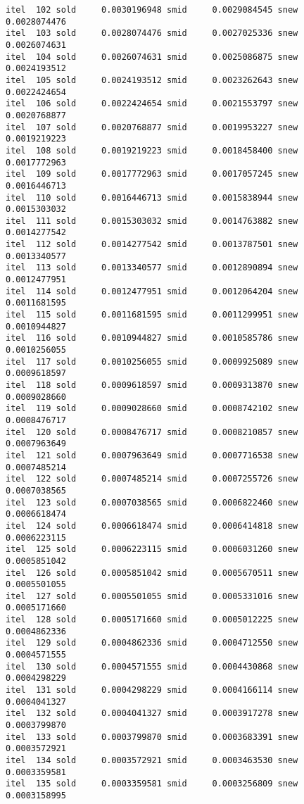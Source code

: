 \documentclass[
  12pt,
  letterpaper,
  DIV=11,
  numbers=noendperiod]{scrartcl}
\begin{document}
\begin{verbatim}
itel  102 sold     0.0030196948 smid     0.0029084545 snew     0.0028074476 
itel  103 sold     0.0028074476 smid     0.0027025336 snew     0.0026074631 
itel  104 sold     0.0026074631 smid     0.0025086875 snew     0.0024193512 
itel  105 sold     0.0024193512 smid     0.0023262643 snew     0.0022424654 
itel  106 sold     0.0022424654 smid     0.0021553797 snew     0.0020768877 
itel  107 sold     0.0020768877 smid     0.0019953227 snew     0.0019219223 
itel  108 sold     0.0019219223 smid     0.0018458400 snew     0.0017772963 
itel  109 sold     0.0017772963 smid     0.0017057245 snew     0.0016446713 
itel  110 sold     0.0016446713 smid     0.0015838944 snew     0.0015303032 
itel  111 sold     0.0015303032 smid     0.0014763882 snew     0.0014277542 
itel  112 sold     0.0014277542 smid     0.0013787501 snew     0.0013340577 
itel  113 sold     0.0013340577 smid     0.0012890894 snew     0.0012477951 
itel  114 sold     0.0012477951 smid     0.0012064204 snew     0.0011681595 
itel  115 sold     0.0011681595 smid     0.0011299951 snew     0.0010944827 
itel  116 sold     0.0010944827 smid     0.0010585786 snew     0.0010256055 
itel  117 sold     0.0010256055 smid     0.0009925089 snew     0.0009618597 
itel  118 sold     0.0009618597 smid     0.0009313870 snew     0.0009028660 
itel  119 sold     0.0009028660 smid     0.0008742102 snew     0.0008476717 
itel  120 sold     0.0008476717 smid     0.0008210857 snew     0.0007963649 
itel  121 sold     0.0007963649 smid     0.0007716538 snew     0.0007485214 
itel  122 sold     0.0007485214 smid     0.0007255726 snew     0.0007038565 
itel  123 sold     0.0007038565 smid     0.0006822460 snew     0.0006618474 
itel  124 sold     0.0006618474 smid     0.0006414818 snew     0.0006223115 
itel  125 sold     0.0006223115 smid     0.0006031260 snew     0.0005851042 
itel  126 sold     0.0005851042 smid     0.0005670511 snew     0.0005501055 
itel  127 sold     0.0005501055 smid     0.0005331016 snew     0.0005171660 
itel  128 sold     0.0005171660 smid     0.0005012225 snew     0.0004862336 
itel  129 sold     0.0004862336 smid     0.0004712550 snew     0.0004571555 
itel  130 sold     0.0004571555 smid     0.0004430868 snew     0.0004298229 
itel  131 sold     0.0004298229 smid     0.0004166114 snew     0.0004041327 
itel  132 sold     0.0004041327 smid     0.0003917278 snew     0.0003799870 
itel  133 sold     0.0003799870 smid     0.0003683391 snew     0.0003572921 
itel  134 sold     0.0003572921 smid     0.0003463530 snew     0.0003359581 
itel  135 sold     0.0003359581 smid     0.0003256809 snew     0.0003158995 

\end{verbatim}
\end{document}
